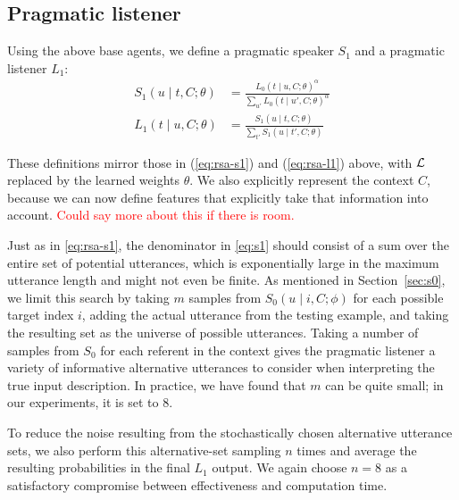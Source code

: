 \documentclass[11pt,letterpaper]{article}
\newcommand{\eq}[1]{(\ref{#1})}
\newcommand{\Listener}{L}
\newcommand{\Speaker}{S}
\newcommand{\utt}{u}
\newcommand{\context}{C}
\newcommand{\target}{t}
\newcommand{\numsamples}{m}
\renewcommand{\|}{\mid}
\newcommand{\secref}[1]{Section~\ref{#1}}
\newcommand{\todocheck}[1]{\textcolor{red}{#1}}
\begin{document}
\subsection{Pragmatic listener}\label{sec:l2}

Using the above base agents, we define a pragmatic speaker
$\Speaker_{1}$ and a pragmatic listener
$\Listener_{1}$:
%
\begin{align}
\Speaker_1(\utt \| \target, \context; \theta)
  &= \frac{\Listener_0(\target \| \utt, \context; \theta)^\alpha}{\sum_{\utt'}
    \Listener_0(\target \| \utt', \context; \theta)^\alpha}
    \label{eq:s1} \\
  \Listener_1(\target \| \utt, \context; \theta)
  &=
    \frac{
    \Speaker_1(\utt \| \target, \context; \theta)
    }{
    \sum_{\target'} \Speaker_1(\utt \| \target', \context; \theta)
    }
\end{align}

These definitions mirror those in \eq{eq:rsa-s1} and \eq{eq:rsa-l1}
above, with $\mathcal{L}$ replaced by the learned weights $\theta$. We also
explicitly represent the context $\context$, because we can now define
features that explicitly take that information into account.
\todocheck{Could say more about this if there is room.}

Just as in \eqref{eq:rsa-s1}, the denominator in \eqref{eq:s1} should consist of a sum over
the entire set of potential utterances, which is exponentially large in the
maximum utterance length and might not even be finite.
As mentioned in \secref{sec:s0}, we limit this search by
taking $\numsamples$ samples from $\Speaker_0(\utt \| i, \context; \phi)$ for
each possible target index $i$, adding the actual utterance from the testing example,
and taking the resulting set as the universe of possible utterances. Taking a number
of samples from $\Speaker_0$ for each referent in the context gives the pragmatic
listener a variety of informative alternative utterances to consider when
interpreting the true input description. In practice, we have found that $\numsamples$
can be quite small; in our experiments, it is set to $8$.

To reduce the noise
resulting from the stochastically chosen alternative utterance sets, we also perform
this alternative-set sampling $n$ times and average the resulting probabilities in
the final $\Listener_1$ output. We again choose $n = 8$ as a satisfactory
compromise between effectiveness and computation time.
\end{document}
